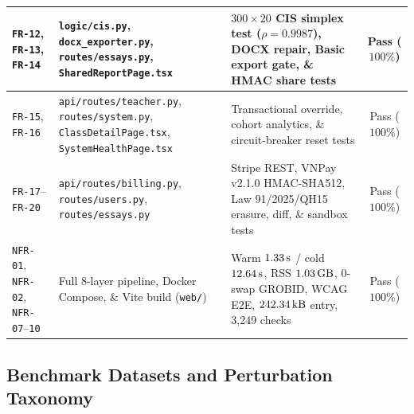 {\begin{longtable}{|L{0.19}|L{0.33}|L{0.34}|C{0.14}|}
\hline
\texttt{FR-12}, \texttt{FR-13}, \texttt{FR-14} & \texttt{logic/cis.py}, \texttt{docx\_exporter.py}, \texttt{routes/essays.py}, \texttt{SharedReportPage.tsx} & $300 \times 20$ CIS simplex test ($\rho = 0.9987$), DOCX repair, Basic export gate, \& HMAC share tests & Pass ($100\%$) \\
\hline
\texttt{FR-15}, \texttt{FR-16} & \texttt{api/\allowbreak{}routes/\allowbreak{}teacher.py}, \texttt{routes/system.py}, \texttt{ClassDetailPage.tsx}, \texttt{SystemHealthPage.tsx} & Transactional override, cohort analytics, \& circuit-breaker reset tests & Pass ($100\%$) \\
\hline
\texttt{FR-17}--\texttt{FR-20} & \texttt{api/routes/billing.py}, \texttt{routes/users.py}, \texttt{routes/essays.py} & Stripe REST, VNPay v2.1.0 HMAC-SHA512, Law 91/2025/QH15 erasure, diff, \& sandbox tests & Pass ($100\%$) \\
\hline
\texttt{NFR-01}, \texttt{NFR-02}, \texttt{NFR-07}--\texttt{10} & Full 8-layer pipeline, Docker Compose, \& Vite build (\texttt{web/}) & Warm $1.33\text{\,s}$ / cold $12.64\text{\,s}$, RSS $1.03\text{\,GB}$, 0-swap GROBID, WCAG E2E, $242.34\text{\,kB}$ entry, 3,249 checks & Pass ($100\%$) \\
\hline
\end{longtable}
}

\subsection{Benchmark Datasets and Perturbation Taxonomy}

